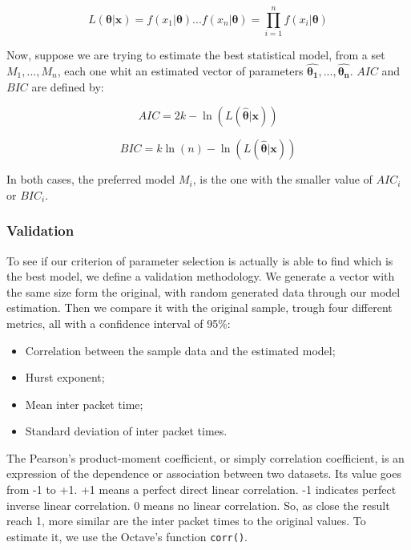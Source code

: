 \begin{equation}
L(\boldsymbol{\theta}|\boldsymbol{x} ) =  f(x_1|\boldsymbol{\theta})...f(x_n|\boldsymbol{\theta}) = \prod_{i = 1}^{n}f(x_i|\boldsymbol{\theta})
\end{equation}

Now, suppose we are trying to estimate the best statistical model, from a set ${M_1, ..., M_n}$, each one whit an estimated vector of parameters  ${\boldsymbol{\hat{\theta_1}}}, ..., {\boldsymbol{\hat{\theta_n}}}$. $AIC$ and $BIC$ are defined by:

\begin{equation}
AIC = 2k - \ln(L(\boldsymbol{\hat{\theta}}|\boldsymbol{x}))
\end{equation}

\begin{equation}
BIC = k\ln(n) - \ln(L(\boldsymbol{\hat{\theta}}|\boldsymbol{x}))
\end{equation}

In both cases, the preferred model $M_i$, is the one with the smaller value of $AIC_i$ or $BIC_i$.




\subsubsection{Validation}

To see if our criterion of parameter selection is actually is able to find which is the best model, we define a validation methodology. 
We generate a vector with the same size form the original, with random generated data through our model estimation. Then we compare it with the original sample, trough four different metrics, all with a confidence interval of 95\%:

\begin{itemize}
\item Correlation between the sample data and the estimated model;
\item Hurst exponent;
\item Mean inter packet time;
\item Standard deviation of inter packet times.
\end{itemize}

The Pearson's product-moment coefficient, or simply correlation coefficient,  is an expression of the dependence or association between two datasets. Its value goes from -1 to +1. +1 means a perfect direct linear correlation. -1 indicates perfect inverse linear correlation. 0 means no linear correlation. So, as close the result reach 1, more similar are the inter packet times to the original values. To estimate it, we use the Octave's function \texttt{corr()}.


